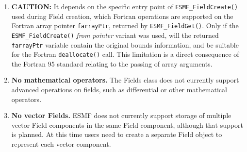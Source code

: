 

\begin{enumerate}
\label{Field:rest}

\item {\bf CAUTION:} It depends on the specific entry point of {\tt ESMF\_FieldCreate()} used during Field creation, which Fortran operations are supported on the Fortran array pointer {\tt farrayPtr}, returned by {\tt ESMF\_FieldGet()}. Only if the {\tt ESMF\_FieldCreate()} {\em from pointer} variant was used, will the returned {\tt farrayPtr} variable contain the original bounds information, and be suitable for the Fortran {\tt deallocate()} call. This limitation is a direct consequence of the Fortran 95 standard relating to the passing of array arguments.

\item {\bf No mathematical operators.}  The Fields class does not 
currently support advanced
operations on fields, such as differential or other
mathematical operators.

\item {\bf No vector Fields.}  ESMF does not currently  support storage of 
multiple vector Field components in the same Field component, although
that support is planned.  At this time users need to create a 
separate Field object to represent each vector component.

\end{enumerate}
